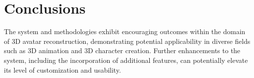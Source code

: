 \section{Conclusions}\label{sec:conclusions}

The system and methodologies exhibit encouraging outcomes within the domain of 3D avatar reconstruction, demonstrating potential applicability in diverse fields such as 3D animation and 3D character creation. Further enhancements to the system, including the incorporation of additional features, can potentially elevate its level of customization and usability.
